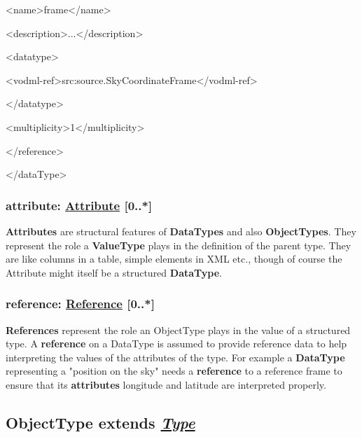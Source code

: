 \documentclass[10pt,a4paper]{ivoa}
\begin{document}
\textless name\textgreater frame\textless/name\textgreater{}

\textless description\textgreater...\textless/description\textgreater{}

\textless datatype\textgreater{}

\textless vodml-ref\textgreater src:source.SkyCoordinateFrame\textless/vodml-ref\textgreater{}

\textless/datatype\textgreater{}

\textless multiplicity\textgreater1\textless/multiplicity\textgreater{}

\textless/reference\textgreater{}

\textless/dataType\textgreater{}

\hypertarget{attribute-attribute-0..}{%
\subsubsection{\texorpdfstring{attribute:
\protect\hyperlink{attribute-extends-role}{Attribute}
{[}0..*{]}}{attribute: Attribute {[}0..*{]}}}\label{attribute-attribute-0..}}

\textbf{Attributes} are structural features of \textbf{DataTypes} and
also \textbf{ObjectTypes}. They represent the role a \textbf{ValueType}
plays in the definition of the parent type. They are like columns in a
table, simple elements in XML etc., though of course the Attribute might
itself be a structured \textbf{DataType}.

\hypertarget{reference-reference-0..}{%
\subsubsection{\texorpdfstring{reference:
\protect\hyperlink{reference-extends-relation}{Reference}
{[}0..*{]}}{reference: Reference {[}0..*{]}}}\label{reference-reference-0..}}

\textbf{References} represent the role an ObjectType plays in the value
of a structured type. A \textbf{reference} on a DataType is assumed to
provide reference data to help interpreting the values of the attributes
of the type. For example a \textbf{DataType} representing a "position on
the sky" needs a \textbf{reference} to a reference frame to ensure that
its \textbf{attributes} longitude and latitude are interpreted properly.

\hypertarget{objecttype-extends-type}{%
\subsection{\texorpdfstring{ObjectType extends
\protect\hyperlink{type-extends-referableelement}{\emph{Type}}}{ObjectType extends Type}}\label{objecttype-extends-type}}
\end{document}
